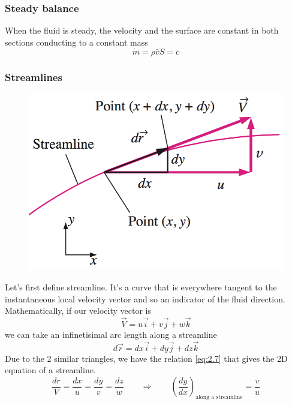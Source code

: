 		\subsubsection{Steady balance}
			When the fluid is steady, the velocity and the surface are constant in both sections conducting to a constant mass
			\begin{equation}
				\dot{m} = \rho \bar{v}S = c
				\label{eq:2.4}
			\end{equation}

		\subsubsection{Streamlines}
			\begin{figure}
			\vspace{-5mm}
			\includegraphics[scale=0.35]{ch2/2}
			\end{figure}
			Let's first define streamline. It's a curve that is everywhere tangent to the instantaneous local velocity vector and so an indicator of the fluid direction. 
			Mathematically, if our velocity vector is 
			\begin{equation}
				\vec{V} = u\vec{i}+v\vec{j}+w\vec{k}
			\end{equation}
			we can take an infinetisimal arc length along a streamline 
			\begin{equation}
				d\vec{r} = dx\vec{i}+dy\vec{j}+dz\vec{k}
			\end{equation}
			Due to the 2 similar triangles, we have the relation \autoref{eq:2.7} that gives the 2D equation of a streamline.
			\begin{equation}
				\frac{dr}{V} = \frac{dx}{u} = \frac{dy}{v} = \frac{dz}{w} \qquad
				 \Rightarrow \qquad
				 \left(\frac{dy}{dx}\right)_{\mbox{along a streamline}} = \frac{v}{u}
				\label{eq:2.7}
			\end{equation}
			
